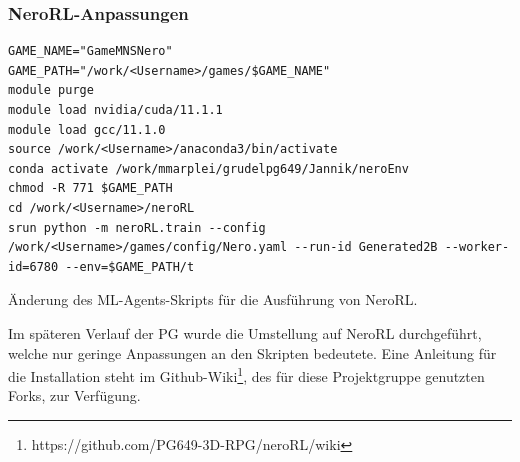 \subsubsection{NeroRL-Anpassungen}
\begin{listing}
	\begin{verbatim}
GAME_NAME="GameMNSNero"
GAME_PATH="/work/<Username>/games/$GAME_NAME"
module purge
module load nvidia/cuda/11.1.1
module load gcc/11.1.0
source /work/<Username>/anaconda3/bin/activate
conda activate /work/mmarplei/grudelpg649/Jannik/neroEnv
chmod -R 771 $GAME_PATH
cd /work/<Username>/neroRL  
srun python -m neroRL.train --config /work/<Username>/games/config/Nero.yaml --run-id Generated2B --worker-id=6780 --env=$GAME_PATH/t
	\end{verbatim}
	\caption{Änderung des ML-Agents-Skripts für die Ausführung von NeroRL.}
	\label{prog:neroRlChanges}
\end{listing}
Im späteren Verlauf der PG wurde die Umstellung auf NeroRL durchgeführt, welche nur geringe Anpassungen an den Skripten bedeutete. Eine Anleitung für die Installation steht im Github-Wiki\footnote{https://github.com/PG649-3D-RPG/neroRL/wiki}, des für diese Projektgruppe genutzten Forks, zur Verfügung.



